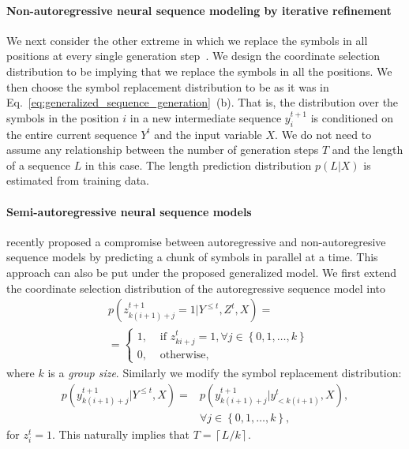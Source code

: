 \documentclass{article}
\begin{document}
\paragraph{Non-autoregressive neural sequence modeling by iterative refinement}
\label{sec:nonauto}

We next consider the other extreme in which we replace the symbols in all positions at every single generation step~\citep{lee2018deterministic}. We design the coordinate selection distribution to be implying that we replace the symbols in all the positions. We then choose the symbol replacement distribution to be as it was in Eq.~\eqref{eq:generalized_sequence_generation}~(b). That is, the distribution over the symbols in the position $i$ in a new intermediate sequence $y_i^{t+1}$ is conditioned on the entire current sequence $Y^t$ and the input variable $X$. We do not need to assume any relationship between the number of generation steps $T$ and the length of a sequence $L$ in this case. The length prediction distribution $p(L|X)$ is estimated from training data.

\paragraph{Semi-autoregressive neural sequence models}

\cite{wang2018semi} recently proposed a compromise between autoregressive and non-autoregresive sequence models by predicting a chunk of symbols in parallel at a time. This approach can also be put under the proposed generalized model. We first extend the coordinate selection distribution of the autoregressive sequence model 
into
\begin{align*}
    &p(z_{k(i+1)+j}^{t+1} = 1 | Y^{\leq t}, Z^{t}, X) =\\
    &= 
    \begin{cases}
    1,& \text{ if } z^{t}_{ki+j} = 1,     \forall j \in \left\{0, 1, \ldots, k \right\} \\
    0,& \text{ otherwise},
    \end{cases}
\end{align*}
where $k$ is a {\it group size}. Similarly we modify the symbol replacement distribution: 
\begin{align*}
    p(y_{k(i+1)+j}^{t+1} | Y^{\leq t}, X) = &p(y_{k(i+1)+j}^{t+1} | y^t_{< k(i+1)}, X), \\
    &\forall j \in \left\{0, 1, \ldots, k \right\},
\end{align*}
for $z_i^t=1$. This naturally implies that $T=\left\lceil L/k \right\rceil$. 
\end{document}
